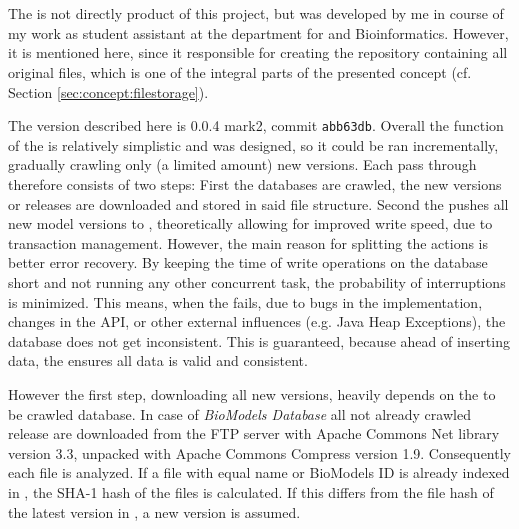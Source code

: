 
\section{\modelcrawler}
	\label{sec:impl:modelcrawler}
	The \modelcrawler is not directly product of this project, but was developed by me in course of my work as student assistant at the department for \sysbio and Bioinformatics. However, it is mentioned here, since it responsible for creating the repository containing all original files, which is one of the integral parts of the presented concept (cf. Section \ref{sec:concept:filestorage}).
	
	The version described here is 0.0.4 mark2, commit \texttt{abb63db}. Overall the function of the \modelcrawler is relatively simplistic and was designed, so it could be ran incrementally, gradually crawling only (a limited amount) new versions. Each pass through therefore consists of two steps: First the databases are crawled, the new versions or releases are downloaded and stored in said file structure.
	Second the \modelcrawler pushes all new model versions to \masymos, theoretically allowing for improved write speed, due to transaction management. However, the main reason for splitting the actions is better error recovery. By keeping the time of write operations on the database short and not running any other concurrent task, the probability of interruptions is minimized. This means, when the \modelcrawler fails, due to bugs in the implementation, changes in the API, or other external influences (e.g. Java Heap Exceptions), the database does not get inconsistent. This is guaranteed, because ahead of inserting data, the \modelcrawler ensures all data is valid and consistent.
	
	However the first step, downloading all new versions, heavily depends on the to be crawled database.
	In case of \emph{BioModels Database} all not already crawled release are downloaded from the FTP server with Apache Commons Net library version 3.3, unpacked with Apache Commons Compress version 1.9. Consequently each \xml file is analyzed.
	If a file with equal name or BioModels ID is already indexed in \masymos, the SHA-1 hash of the files is calculated. If this differs from the file hash of the latest version in \masymos, a new version is assumed.
	

